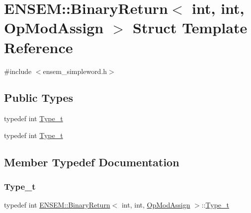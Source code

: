 \hypertarget{structENSEM_1_1BinaryReturn_3_01int_00_01int_00_01OpModAssign_01_4}{}\section{E\+N\+S\+EM\+:\+:Binary\+Return$<$ int, int, Op\+Mod\+Assign $>$ Struct Template Reference}
\label{structENSEM_1_1BinaryReturn_3_01int_00_01int_00_01OpModAssign_01_4}


{\ttfamily \#include $<$ensem\+\_\+simpleword.\+h$>$}

\subsection*{Public Types}
\begin{DoxyCompactItemize}
\item 
typedef int \mbox{\hyperlink{structENSEM_1_1BinaryReturn_3_01int_00_01int_00_01OpModAssign_01_4_a3b37439e87d2e89d2bf9f5b7738f2a61}{Type\+\_\+t}}
\item 
typedef int \mbox{\hyperlink{structENSEM_1_1BinaryReturn_3_01int_00_01int_00_01OpModAssign_01_4_a3b37439e87d2e89d2bf9f5b7738f2a61}{Type\+\_\+t}}
\end{DoxyCompactItemize}


\subsection{Member Typedef Documentation}
\mbox{\label{structENSEM_1_1BinaryReturn_3_01int_00_01int_00_01OpModAssign_01_4_a3b37439e87d2e89d2bf9f5b7738f2a61}} 
\subsubsection{\texorpdfstring{Type\_t}{Type\_t}\hspace{0.1cm}{\footnotesize\ttfamily [1/2]}}
{\footnotesize\ttfamily typedef int \mbox{\hyperlink{structENSEM_1_1BinaryReturn}{E\+N\+S\+E\+M\+::\+Binary\+Return}}$<$ int, int, \mbox{\hyperlink{structENSEM_1_1OpModAssign}{Op\+Mod\+Assign}} $>$\+::\mbox{\hyperlink{structENSEM_1_1BinaryReturn_3_01int_00_01int_00_01OpModAssign_01_4_a3b37439e87d2e89d2bf9f5b7738f2a61}{Type\+\_\+t}}}


